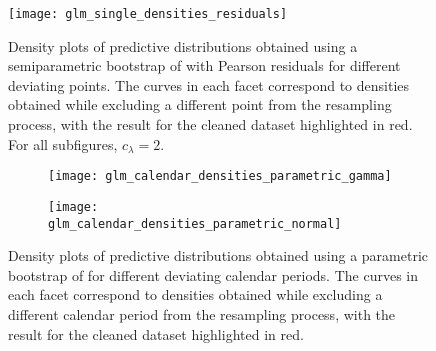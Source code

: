 \documentclass[a4paper]{book}
\begin{document}
\begin{landscape}
  \begin{figure}
    \centering
    \texttt{[image: glm\_single\_densities\_residuals]}
    \caption[Single outlier density plots for ODP model, semiparametric bootstrap with Pearson residuals]{Density plots of predictive distributions obtained using a semiparametric bootstrap of  with Pearson residuals for different deviating points. The curves in each facet correspond to densities obtained while excluding a different point from the resampling process, with the result for the cleaned dataset highlighted in red. For all subfigures, $c_\lambda = 2$.}
    \label{fig:odp-single-semiparam}
  \end{figure}
\end{landscape}

\begin{landscape}
  \begin{figure}
    \begin{subfigure}{0.5\linewidth}
      \centering
      \texttt{[image: glm\_calendar\_densities\_parametric\_gamma]}
      \label{fig:odp-calendar-param-gamma}
    \end{subfigure}
    \begin{subfigure}{0.5\linewidth}
      \centering
      \texttt{[image: glm\_calendar\_densities\_parametric\_normal]}
      \label{fig:odp-calendar-param-norm}
    \end{subfigure}
    \caption[Calendar outlier density plots for ODP model, parametric bootstrap with normal distribution]{Density plots of predictive distributions obtained using a parametric bootstrap of  for different deviating calendar periods. The curves in each facet correspond to densities obtained while excluding a different calendar period from the resampling process, with the result for the cleaned dataset highlighted in red.}
  \end{figure}
\end{landscape}
\end{document}
